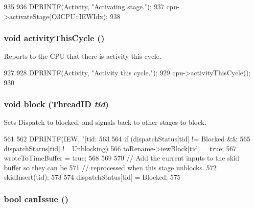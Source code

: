 \begin{DoxyCode}
935 {
936     DPRINTF(Activity, "Activating stage.\n");
937     cpu->activateStage(O3CPU::IEWIdx);
938 }
\end{DoxyCode}
\hypertarget{classDefaultIEW_ad7e5c2506873e8dc8c71740ac6dabb23}{
\subsubsection[{activityThisCycle}]{\setlength{\rightskip}{0pt plus 5cm}void activityThisCycle ()}}
\label{classDefaultIEW_ad7e5c2506873e8dc8c71740ac6dabb23}
Reports to the CPU that there is activity this cycle. 


\begin{DoxyCode}
927 {
928     DPRINTF(Activity, "Activity this cycle.\n");
929     cpu->activityThisCycle();
930 }
\end{DoxyCode}
\hypertarget{classDefaultIEW_a0c1ca72524d2661cee99b06f2ba54de7}{
\subsubsection[{block}]{\setlength{\rightskip}{0pt plus 5cm}void block ({\bf ThreadID} {\em tid})}}
\label{classDefaultIEW_a0c1ca72524d2661cee99b06f2ba54de7}
Sets Dispatch to blocked, and signals back to other stages to block. 


\begin{DoxyCode}
561 {
562     DPRINTF(IEW, "[tid:%
563 
564     if (dispatchStatus[tid] != Blocked &&
565         dispatchStatus[tid] != Unblocking) {
566         toRename->iewBlock[tid] = true;
567         wroteToTimeBuffer = true;
568     }
569 
570     // Add the current inputs to the skid buffer so they can be
571     // reprocessed when this stage unblocks.
572     skidInsert(tid);
573 
574     dispatchStatus[tid] = Blocked;
575 }
\end{DoxyCode}
\hypertarget{classDefaultIEW_a93204549d4730243f4d1b4873ff0ffef}{
\subsubsection[{canIssue}]{\setlength{\rightskip}{0pt plus 5cm}bool canIssue ()}}
\label{classDefaultIEW_a93204549d4730243f4d1b4873ff0ffef}



